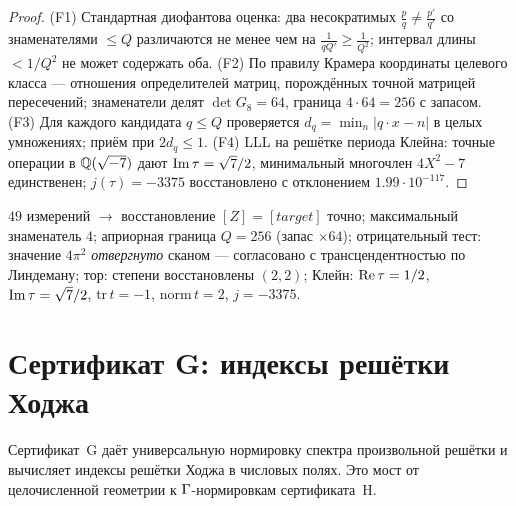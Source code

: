 \begin{proof}
(F1) Стандартная диофантова оценка: два несократимых $\frac pq\ne
\frac{p'}{q'}$ со знаменателями $\le Q$ различаются не менее чем на
$\frac{1}{qQ'}\ge\frac{1}{Q^2}$; интервал длины $<1/Q^2$ не может
содержать оба. (F2) По правилу Крамера координаты целевого класса —
отношения определителей матриц, порождённых точной матрицей
пересечений; знаменатели делят $\det G_8=64$, граница $4\cdot64=256$
с запасом. (F3) Для каждого кандидата $q\le Q$ проверяется
$d_q=\min_n|q\cdot x-n|$ в целых умножениях; приём при $2d_q\le1$.
(F4) LLL на решётке периода Клейна: точные операции в $\mathbb{Q}(\sqrt{-7})$
дают $\operatorname{Im}\tau=\sqrt7/2$, минимальный многочлен $4X^2-7$
единственен; $j(\tau)=-3375$ восстановлено с отклонением
$1.99\cdot10^{-117}$.
\end{proof}

\begin{databox}
$49$ измерений $\to$ восстановление $[Z]=[target]$ точно; максимальный
знаменатель $4$; априорная граница $Q=256$ (запас $\times64$);
отрицательный тест: значение $4\pi^2$ \emph{отвергнуто} сканом —
согласовано с трансцендентностью по Линдеману; тор: степени
восстановлены $(2,2)$; Клейн: $\operatorname{Re}\tau=1/2$, $\operatorname{Im}\tau=\sqrt7/2$,
$\mathrm{tr}\,t=-1$, $\mathrm{norm}\,t=2$, $j=-3375$.
\end{databox}

\section{Сертификат G: индексы решётки Ходжа}\label{sec:certG}

Сертификат~G даёт универсальную нормировку спектра произвольной
решётки и вычисляет индексы решётки Ходжа в числовых полях. Это
мост от целочисленной геометрии к $\Gamma$-нормировкам сертификата~H.

